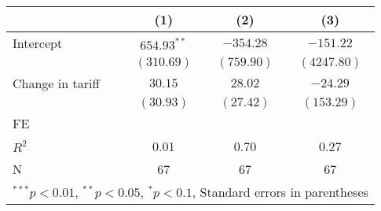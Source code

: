 
\begin{tabular}{l c c c }
\hline
 & (1) & (2) & (3) \\
\hline
Intercept & $654.93^{**}$ & $-354.28$  & $-151.22$   \\
            & $(310.69)$    & $(759.90)$ & $(4247.80)$ \\
Change in tariff     & $30.15$       & $28.02$    & $-24.29$    \\
            & $(30.93)$     & $(27.42)$  & $(153.29)$  \\
\hline
FE          &                &                &                \\ 
\hline
$R^2$       & 0.01          & 0.70       & 0.27        \\
N           & 67            & 67         & 67          \\
\hline
\multicolumn{4}{l}{\scriptsize{$^{***}p<0.01$, $^{**}p<0.05$, $^*p<0.1$, Standard errors in parentheses}}
\end{tabular}
